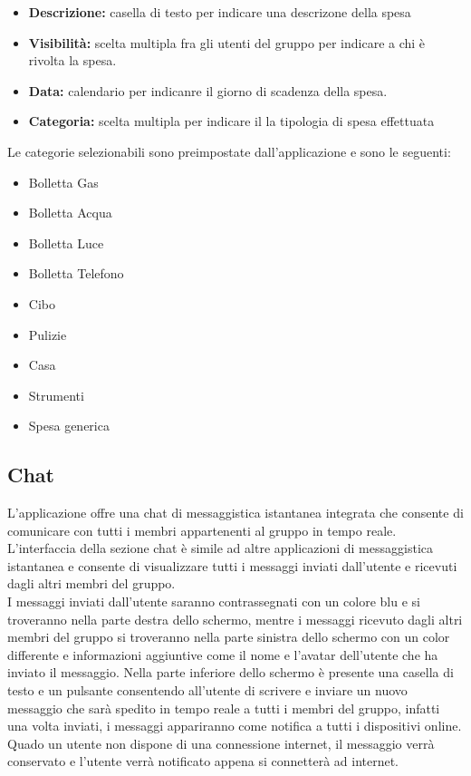 \begin{itemize}
   \item \textbf{Descrizione:} casella di testo per indicare una descrizone della spesa
   \item \textbf{Visibilità:} scelta multipla fra gli utenti del gruppo per indicare a chi è rivolta la spesa.
   \item \textbf{Data:} calendario per indicanre il giorno di scadenza della spesa.
   \item \textbf{Categoria:} scelta multipla per indicare il la tipologia di spesa effettuata
\end{itemize}
Le categorie selezionabili sono preimpostate dall'applicazione e sono le seguenti:
\begin{itemize}
    \item Bolletta Gas
    \item Bolletta Acqua
    \item Bolletta Luce
    \item Bolletta Telefono
    \item Cibo
    \item Pulizie
    \item Casa
    \item Strumenti
    \item Spesa generica
\end{itemize}




\subsection{Chat}
L'applicazione offre una chat di messaggistica istantanea integrata che consente di comunicare con tutti i membri appartenenti al gruppo in tempo reale.\\
L'interfaccia della sezione chat è simile ad altre applicazioni di messaggistica istantanea e consente di visualizzare tutti i messaggi inviati dall'utente e ricevuti dagli altri membri del gruppo.\\
I messaggi inviati dall'utente saranno contrassegnati con un colore blu e si troveranno nella parte destra dello schermo, mentre i messaggi ricevuto dagli altri membri del gruppo si troveranno nella parte sinistra dello schermo con un color differente e informazioni aggiuntive come il nome e l'avatar dell'utente che ha inviato il messaggio.
Nella parte inferiore dello schermo è presente una casella di testo e un pulsante consentendo all'utente di scrivere e inviare un nuovo messaggio che sarà spedito in tempo reale a tutti i membri del gruppo, infatti una volta inviati, i messaggi appariranno come notifica a tutti i dispositivi online.\\
Quado un utente non dispone di una connessione internet, il messaggio verrà conservato e l'utente verrà notificato appena si connetterà ad internet.


